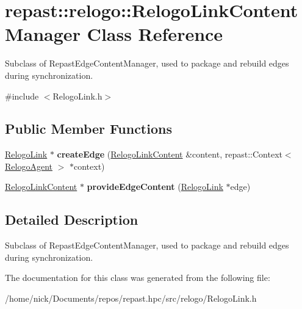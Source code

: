 \hypertarget{classrepast_1_1relogo_1_1_relogo_link_content_manager}{\section{repast\-:\-:relogo\-:\-:Relogo\-Link\-Content\-Manager Class Reference}
\label{classrepast_1_1relogo_1_1_relogo_link_content_manager}
}


Subclass of Repast\-Edge\-Content\-Manager, used to package and rebuild edges during synchronization.  




{\ttfamily \#include $<$Relogo\-Link.\-h$>$}

\subsection*{Public Member Functions}
\begin{DoxyCompactItemize}
\item 
\hypertarget{classrepast_1_1relogo_1_1_relogo_link_content_manager_af34a2cc9aa6331c617de6e0af7a5eca4}{\hyperlink{classrepast_1_1relogo_1_1_relogo_link}{Relogo\-Link} $\ast$ {\bfseries create\-Edge} (\hyperlink{classrepast_1_1relogo_1_1_relogo_link_content}{Relogo\-Link\-Content} \&content, repast\-::\-Context$<$ \hyperlink{classrepast_1_1relogo_1_1_relogo_agent}{Relogo\-Agent} $>$ $\ast$context)}\label{classrepast_1_1relogo_1_1_relogo_link_content_manager_af34a2cc9aa6331c617de6e0af7a5eca4}

\item 
\hypertarget{classrepast_1_1relogo_1_1_relogo_link_content_manager_a4e85e7973518f8d58c0baaa2272f027e}{\hyperlink{classrepast_1_1relogo_1_1_relogo_link_content}{Relogo\-Link\-Content} $\ast$ {\bfseries provide\-Edge\-Content} (\hyperlink{classrepast_1_1relogo_1_1_relogo_link}{Relogo\-Link} $\ast$edge)}\label{classrepast_1_1relogo_1_1_relogo_link_content_manager_a4e85e7973518f8d58c0baaa2272f027e}

\end{DoxyCompactItemize}


\subsection{Detailed Description}
Subclass of Repast\-Edge\-Content\-Manager, used to package and rebuild edges during synchronization. 

The documentation for this class was generated from the following file\-:\begin{DoxyCompactItemize}
\item 
/home/nick/\-Documents/repos/repast.\-hpc/src/relogo/Relogo\-Link.\-h\end{DoxyCompactItemize}
